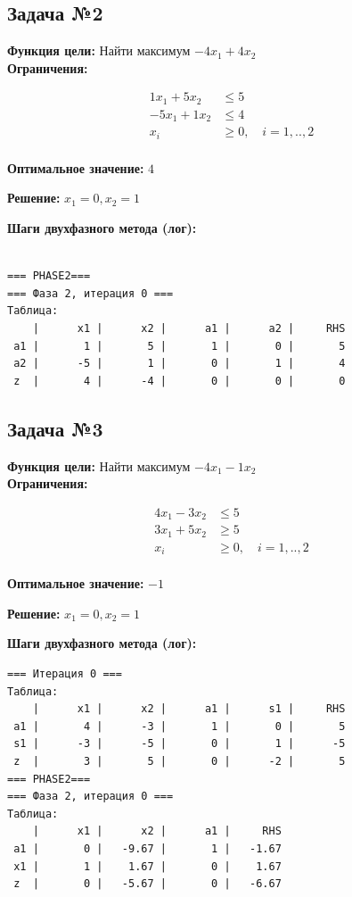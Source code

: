 \documentclass[a4paper,12pt]{article}
\begin{document}
\subsection*{Задача №2}
\textbf{Функция цели: }
Найти максимум $ -4x_{1} +4x_{2} $\\

\textbf{Ограничения:}

\[ \begin{aligned}
1x_{1} +5x_{2} &\le 5 \\
-5x_{1} +1x_{2} &\le 4 \\
x_i &\ge 0,\quad i=1,..,2\\
\end{aligned}\]

\textbf{Оптимальное значение: }$4$

\textbf{Решение: }$x_{1}=0, x_{2}=1$

\textbf{Шаги двухфазного метода (лог):}

\begin{verbatim}

=== PHASE2===
=== Фаза 2, итерация 0 ===
Таблица:
    |      x1 |      x2 |      a1 |      a2 |     RHS
 a1 |       1 |       5 |       1 |       0 |       5
 a2 |      -5 |       1 |       0 |       1 |       4
 z  |       4 |      -4 |       0 |       0 |       0
\end{verbatim}



\subsection*{Задача №3}
\textbf{Функция цели: }
Найти максимум $ -4x_{1} -1x_{2} $\\

\textbf{Ограничения:}

\[ \begin{aligned}
4x_{1} -3x_{2} &\le 5 \\
3x_{1} +5x_{2} &\ge 5 \\
x_i &\ge 0,\quad i=1,..,2\\
\end{aligned}\]

\textbf{Оптимальное значение: }$-1$

\textbf{Решение: }$x_{1}=0, x_{2}=1$

\textbf{Шаги двухфазного метода (лог):}

\begin{verbatim}
=== Итерация 0 ===
Таблица:
    |      x1 |      x2 |      a1 |      s1 |     RHS
 a1 |       4 |      -3 |       1 |       0 |       5
 s1 |      -3 |      -5 |       0 |       1 |      -5
 z  |       3 |       5 |       0 |      -2 |       5
=== PHASE2===
=== Фаза 2, итерация 0 ===
Таблица:
    |      x1 |      x2 |      a1 |     RHS
 a1 |       0 |   -9.67 |       1 |   -1.67
 x1 |       1 |    1.67 |       0 |    1.67
 z  |       0 |   -5.67 |       0 |   -6.67
\end{verbatim}
\end{document}

